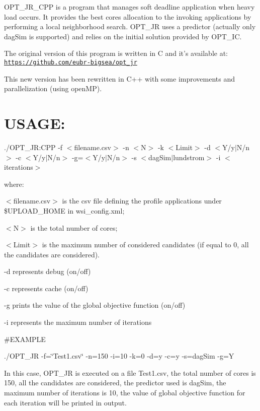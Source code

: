 O\-P\-T\-\_\-\-J\-R\-\_\-\-C\-P\-P is a program that manages soft deadline application when heavy load occurs. It provides the best cores allocation to the invoking applications by performing a local neighborhood search. O\-P\-T\-\_\-\-J\-R uses a predictor (actually only dag\-Sim is supported) and relies on the initial solution provided by O\-P\-T\-\_\-\-I\-C.

The original version of this program is written in C and it’s available at\-: \href{https://github.com/eubr-bigsea/opt_jr}{\tt https\-://github.\-com/eubr-\/bigsea/opt\-\_\-jr}

This new version has been rewritten in C++ with some improvements and parallelization (using open\-M\-P).

\section*{U\-S\-A\-G\-E\-:}

{\ttfamily ./\-O\-P\-T\-\_\-\-J\-R\-:C\-P\-P -\/f $<$filename.\-csv$>$ -\/n $<$N$>$ -\/k $<$Limit$>$ -\/d $<$Y/y$|$\-N/n$>$ -\/c $<$Y/y$|$\-N/n$>$ -\/g=$<$Y/y$|$\-N/n$>$ -\/s $<$dag\-Sim$|$lundstrom$>$ -\/i $<$iterations$>$}

where\-:

{\ttfamily $<$filename.\-csv$>$ is the csv file defining the profile applications under \$\-U\-P\-L\-O\-A\-D\-\_\-\-H\-O\-M\-E in wsi\-\_\-config.\-xml;}

{\ttfamily $<$N$>$ is the total number of cores;}

{\ttfamily $<$Limit$>$ is the maximum number of considered candidates (if equal to 0, all the candidates are considered).}

{\ttfamily -\/d represents debug (on/off)}

{\ttfamily -\/c represents cache (on/off)}

{\ttfamily -\/g prints the value of the global objective function (on/off)}

{\ttfamily -\/i represents the maximum number of iterations}

\#\-E\-X\-A\-M\-P\-L\-E

{\ttfamily ./\-O\-P\-T\-\_\-\-J\-R -\/f=\char`\"{}\-Test1.\-csv\char`\"{} -\/n=150 -\/i=10 -\/k=0 -\/d=y -\/c=y -\/s=dag\-Sim -\/g=Y}

In this case, O\-P\-T\-\_\-\-J\-R is executed on a file Test1.\-csv, the total number of cores is 150, all the candidates are considered, the predictor used is dag\-Sim, the maximum number of iterations is 10, the value of global objective function for each iteration will be printed in output.

